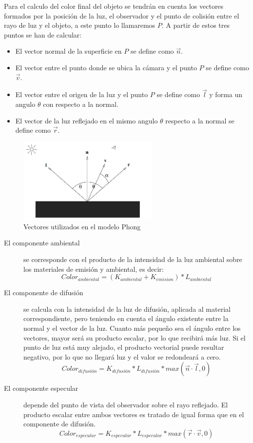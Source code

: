 Para el calculo del color final del objeto se tendrán en cuenta los vectores formados por la posición de la luz, el observador y el punto de colisión entre el rayo de luz y el objeto, a este punto lo llamaremos $P$. A partir de estos tres puntos se han de calcular:
\begin{itemize}
\item El vector normal de la superficie en $ P $ se define como $  \vec{n} $.
\item El vector entre el punto donde se ubica la cámara y el punto $P$ se define como   $ \vec{v}$.
\item El vector entre el origen de la luz y el punto $ P $ se define como  $  \vec{l} $ y forma un angulo $\theta$ con respecto a la normal.
\item El vector de la luz reflejado en el mismo angulo $\theta$ respecto a la normal se define como $ \vec{r}$.
\end{itemize}

\begin{figure}[h!]
	\centering
	          \includegraphics[width=7cm]{img/phongVector.jpg}
	\caption{Vectores utilizados en el modelo Phong}
\end{figure}

\begin{description}
\item [El componente ambiental] se corresponde con el producto de la intensidad de la luz ambiental sobre los materiales de emisión y ambiental, es decir: 
	$$ Color_{ambiental} = ( K_{ambiental} + K_{emision} ) * L_{ambiental} $$

\item [El componente de difusión] se calcula con la intensidad de la luz de difusión, aplicada al material correspondiente, pero teniendo en cuenta el ángulo existente entre la normal y el vector de la luz. Cuanto más pequeño sea el ángulo entre los vectores, mayor será su producto escalar, por lo que recibirá más luz. Si el punto de luz está muy alejado, el producto vectorial puede resultar negativo, por lo que no llegará luz y el valor se redondeará a cero. 
	$$ Color_{difusión} = K_{difusión} * L_{difusión} *max(\vec{n} \cdot \vec{l}, 0)$$

\item [El componente especular] depende del punto de vista del observador sobre el rayo reflejado. El producto escalar entre ambos vectores es tratado de igual forma que en el componente de difusión.
	$$ Color_{especular} = K_{especular} * L_{especular} *max( \vec{r} \cdot \vec{v}, 0)$$

\end{description}

